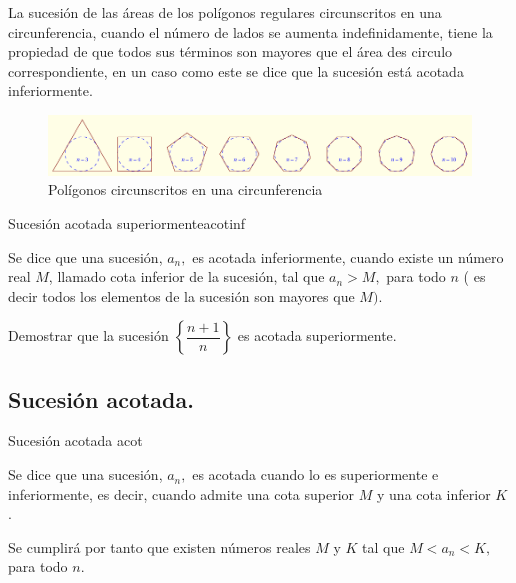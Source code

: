\documentclass[oneside,english,spanish,2m,twoside,svgnames,x11names,HTML,twoside,12pt]{libro-matua}\usepackage[]{graphicx}\usepackage[]{color}
\begin{document}
\begin{ejemplo}

La sucesión de las áreas de los polígonos regulares circunscritos
en una circunferencia, cuando el número de lados se aumenta indefinidamente,
tiene la propiedad de que todos sus términos son mayores que el área
des circulo correspondiente, en un caso como este se dice que la sucesión
está acotada inferiormente. 

\begin{figure}[H]
\centering\includegraphics{1_home_antalcides_MEGA_calculo_I_libro_pdf_poligonoreg1.pdf}\caption{Polígonos circunscritos en una circunferencia}\label{fig:poligono2}
\end{figure}

\end{ejemplo}

\begin{defi}{Sucesión acotada superiormente}{acotinf}

Se dice que una sucesión, $a_{n},$ es acotada inferiormente, cuando
existe un número real $M$, llamado cota inferior de la sucesión,
tal que $a_{n}>M,$ para todo $n$ ( es decir todos los elementos
de la sucesión son mayores que $M).$ 

\end{defi}

\begin{ejercicio}

Demostrar que la sucesión $\left\{ \dfrac{n+1}{n}\right\} $ es acotada
superiormente.

\end{ejercicio}

\subsection{Sucesión acotada.}

\begin{defi}{Sucesión acotada }{acot}

Se dice que una sucesión, $a_{n},$ es acotada cuando lo es superiormente
e inferiormente, es decir, cuando admite una cota superior $M$ y
una cota inferior $K$ .

Se cumplirá por tanto que existen números reales $M$ y $K$ tal que
$M<a_{n}<K,$ para todo $n.$ 

\end{defi}
\end{document}
